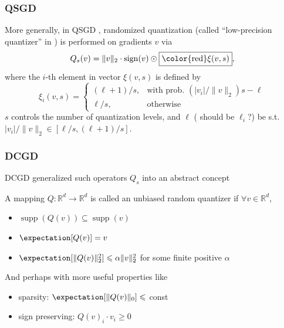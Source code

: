 
\begin{frame}
\frametitle{QSGD}

More generally, in QSGD \cite{alistarh2017qsgd}, randomized quantization (called ``low-precision quantizer'' in \cite{khirirat2018dcgd}) is performed on gradients $v$ via
$$Q_s(v) = \lVert v \rVert_2 \cdot \operatorname{sign}(v) \odot \framebox{\color{red}$\xi(v,s)$},$$
where the $i$-th element in vector $\xi(v,s)$ is defined by
\begin{equation*}
    \xi_i(v,s) = \begin{cases}
    (\ell+1)/s, & \text{with prob. } (|v_i|/\lVert v \rVert_2) s - \ell \\
    \ell/s, & \text{otherwise}
    \end{cases}
\end{equation*}
$s$ controls the number of quantization levels, and $\ell$ ({\color{red} should be $\ell_i$?}) be s.t. $|v_i|/\lVert v \rVert_2 \in [\ell/s, (\ell+1)/s]$.


\end{frame}


\begin{frame}
\frametitle{DCGD}

DCGD \cite{khirirat2018dcgd} generalized such operators $Q_s$ into an abstract concept

\begin{Def}
A mapping $Q:\mathbb{R}^d \to \mathbb{R}^d$ is called an unbiased random quantizer if $\forall v \in \mathbb{R}^d$,
\begin{itemize}
    \item $\operatorname{supp}(Q(v)) \subseteq \operatorname{supp}(v)$
    \item $\expectation [Q(v)] = v$
    \item $\expectation [\lVert Q(v) \rVert_2^2] \leqslant \alpha \lVert v \rVert_2^2$ for some finite positive $\alpha$
\end{itemize}
\end{Def}

And perhaps with more useful properties like
\begin{itemize}
    \item sparsity: $\expectation [\lVert Q(v) \rVert_0] \leqslant$ const
    \item sign preserving: $Q(v)_i \cdot v_i \geqslant 0$
\end{itemize}


\end{frame}

